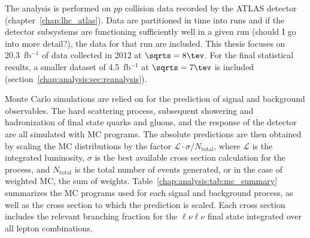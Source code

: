 
The analysis is performed on $pp$ collision data recorded by the ATLAS
detector (chapter~\ref{chap:lhc_atlas}). Data are partitioned in
time into runs and if the detector subsystems are functioning
sufficiently well in a given run (should I go into more detail?),
the data for that run are included. This thesis focuses on
20.3~fb$^{-1}$ of data collected in 2012 at $\sqrts =8 \tev$. For the
final statistical results, a smaller dataset of
4.5~fb$^{-1}$ at $\sqrts =7 \tev$ is included
(section~\ref{chap:analysis:sec:reanalysis}).

Monte Carlo simulations are relied on for the prediction of signal and
background observables. The hard scattering process, subsequent
showering and hadronization of final state quarks and gluons, and the
response of the detector are all simulated with MC programs. The
absolute predictions are then obtained by scaling the MC distributions
by the factor $\mathcal{L}\cdot{\sigma}/N_{\mathrm{total}}$,
where $\mathcal{L}$ is the integrated luminosity, $\sigma$ is the best
available cross section calculation for the process, and
$N_{\mathrm{total}}$ is the total number of events generated, or in
the case of weighted MC, the sum of
weights. Table~\ref{chap:analysis:tab:mc_summary} summarizes the MC
programs used for each signal and background process, as well as the
cross section to which the prediction is scaled. Each cross section
includes the relevant branching fraction for the $\ell\nu\ell\nu$
final state integrated over all lepton combinations. 

